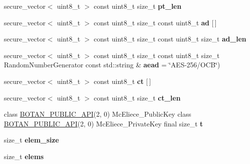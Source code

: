 \begin{DoxyCompactItemize}
secure\+\_\+vector$<$ uint8\+\_\+t $>$ const uint8\+\_\+t size\+\_\+t {\bfseries pt\+\_\+len}
\item 
\mbox{\label{namespace_botan_af3908e7a9a541a30b8f12f411195bb0d}} 
secure\+\_\+vector$<$ uint8\+\_\+t $>$ const uint8\+\_\+t size\+\_\+t const uint8\+\_\+t {\bfseries ad} \mbox{[}$\,$\mbox{]}
\item 
\mbox{\label{namespace_botan_af05280f78468cb5278c6981f587d1413}} 
secure\+\_\+vector$<$ uint8\+\_\+t $>$ const uint8\+\_\+t size\+\_\+t const uint8\+\_\+t size\+\_\+t {\bfseries ad\+\_\+len}
\item 
\mbox{\label{namespace_botan_ac31fe27d62003da6615ede6eefecf9e2}} 
secure\+\_\+vector$<$ uint8\+\_\+t $>$ const uint8\+\_\+t size\+\_\+t const uint8\+\_\+t size\+\_\+t Random\+Number\+Generator const std\+::string \& {\bfseries aead} = \char`\"{}A\+ES-\/256/O\+CB\char`\"{})
\item 
\mbox{\label{namespace_botan_a7b25d2187260c0f4994b47ac51f1193d}} 
secure\+\_\+vector$<$ uint8\+\_\+t $>$ const uint8\+\_\+t {\bfseries ct} \mbox{[}$\,$\mbox{]}
\item 
\mbox{\label{namespace_botan_a82688ab21aa95be4d8195067242b1c11}} 
secure\+\_\+vector$<$ uint8\+\_\+t $>$ const uint8\+\_\+t size\+\_\+t {\bfseries ct\+\_\+len}
\item 
\mbox{\label{namespace_botan_aa4531842d0db6b426dcf54e400936077}} 
class \hyperlink{namespace_botan_a6b9388030d872e586a4655b776ac9501}{B\+O\+T\+A\+N\+\_\+\+P\+U\+B\+L\+I\+C\+\_\+\+A\+PI}(2, 0) Mc\+Eliece\+\_\+\+Public\+Key class \hyperlink{namespace_botan_a6b9388030d872e586a4655b776ac9501}{B\+O\+T\+A\+N\+\_\+\+P\+U\+B\+L\+I\+C\+\_\+\+A\+PI}(2, 0) Mc\+Eliece\+\_\+\+Private\+Key final size\+\_\+t {\bfseries t}
\item 
\mbox{\label{namespace_botan_aa27e36b1de262f5dd9a65eb0c0e77a45}} 
size\+\_\+t {\bfseries elem\+\_\+size}
\item 
\mbox{\label{namespace_botan_a552b48f7f536d58127ea40040deaf8d9}} 
size\+\_\+t {\bfseries elems}
\item 

\end{DoxyCompactItemize}
